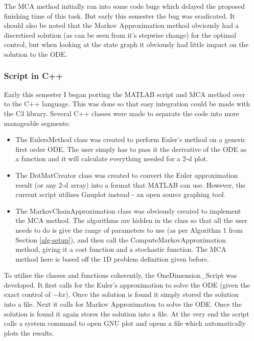 \documentclass[11pt,draftd]{article}
\begin{document}
The MCA method initially ran into some code bugs which delayed the proposed finishing time of this task. But early this semester the bug was eradicated. It should also be noted that the Markov Approximation method obviously had a discretised solution (as can be seen from it's stepwise change) for the optimal control, but when looking at the state graph it obviously had little impact on the solution to the ODE. \\

\subsubsection{Script in C++}
Early this semester I began porting the MATLAB script and MCA method over to the C++ language. This was done so that easy integration could be made with the C3 library. Several C++ classes were made to separate the code into more manageable segments: \\
\begin{itemize}
	\item The EulersMethod class was created to perform Euler's method on a generic first order ODE. The user simply has to pass it the derivative of the ODE as a function and it will calculate everything needed for a 2-d plot.
	\item The DotMatCreator class was created to convert the Euler approximation result (or any 2-d array) into a format that MATLAB can use. However, the current script utilises Gnuplot instead - an open source graphing tool.
	\item The MarkovChainApproximation class was obviously created to implement the MCA method. The algorithms are hidden in the class so that all the user needs to do is give the range of parameters to use (as per Algorithm 1 from Section \ref{alg-setup}), and then call the ComputeMarkovApproximation method, giving it a cost function and a stochastic function. The MCA method here is based off the 1D problem definition given before. \\
\end{itemize}

To utilise the classes and functions coherently, the OneDimension\_Script was developed. It first calls for the Euler's approximation to solve the ODE (given the exact control of $ -kx $). Once the solution is found it simply stored the solution into a file. Next it calls for Markov Approximation to solve the ODE. Once the solution is found it again stores the solution into a file. At the very end the script calls a system command to open GNU plot and opens a file which automatically plots the results. \\
\end{document}
